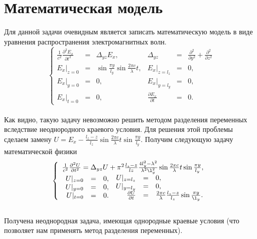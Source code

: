 \chapter{Математическая модель}

Для данной задачи очевидным является записать математическую модель в
виде уравнения распространения электромагнитных волн.
\[
\left\{
\begin{array}{rclrcl}
  \frac{1}{c^2} \frac{\partial^2 E_x}{\partial t^2} &=& \Delta_{yz}
  E_x, & \Delta_{yz} &=& \frac{\partial^2}{\partial y^2} + \frac{\partial^2}{\partial z^2}\\
  E_x|_{z=0} &=& \sin\frac{\pi y}{l_y} \sin\frac{2\pi c}{\lambda}t, & E_x|_{z=l_z} &=& 0,\\
  E_x|_{y=0} &=& 0, & E_x|_{y=l_y} &=& 0,\\
  E_x|_{t=0} &=& 0, & \frac{\partial E_x}{\partial t} &=& 0.
\end{array}
\right.
\]
\\
Как видно, такую задачу невозможно решить методом разделения
переменных вследствие неоднородного краевого условия. Для решения этой
проблемы сделаем замену $U = E_x - \frac{l_z - z}{l_z} \sin\frac{2\pi
  c}{\lambda}t \sin\frac{\pi y}{l_y}$. Получим следующую задачу
математической физики
\[
\left\{
  \begin{array}{l}
    \frac{1}{c^2} \frac{\partial^2 U}{\partial t^2} = \Delta_{yz} U + \pi^2
    \frac{l_z - z}{lz}\frac{4l_y^2 - \lambda^2}{\lambda^2
      \l_y^2}\sin\frac{2\pi c}{\lambda}t \sin\frac{\pi y}{l_y},\\
    \begin{array}{rcl}
      U|_{z=0} &=& 0,\\
      U|_{y=0} &=& 0,\\
      U|_{t=0} &=& 0.\\
    \end{array}
    \begin{array}{rcl}
      U|_{z=l_z} &=& 0,\\
      U|_{y=l_y} &=& 0,\\
      \frac{\partial U}{\partial t} &=& \frac{2\pi
        c}{\lambda} \frac{l_z - z}{l_z} \sin\frac{\pi y}{\l_y}.
    \end{array}
  \end{array}
\right.
\]
\\
Получена неоднородная задача, имеющая однородные краевые условия (что
позволяет нам применять метод разделения переменных).
